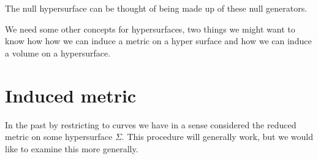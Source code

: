 \documentclass[10pt]{article}
\begin{document}
	The null hypersurface can be thought of being made up of these null generators. 
	
		We need some other concepts for hypersurfaces, two things we might want to know how how we can induce a metric on a hyper surface and how we can induce a volume on a hypersurface. 
		
	\section{Induced metric}
In the past by restricting to curves we have in a sense considered the reduced metric on some hypersurface $\Sigma$. This procedure will generally work, but we would like to examine this more generally. 
	
	
	\begin{figure}[h]
	\begin{center}
	


\begin{tikzpicture}[x=0.75pt,y=0.75pt,yscale=-1,xscale=1]


\end{tikzpicture}
\end{center}
\end{figure}
\end{document}
